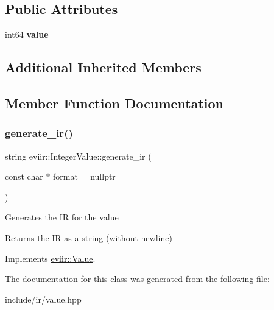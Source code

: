 \subsection*{Public Attributes}
\begin{DoxyCompactItemize}
\item 
\mbox{\label{classeviir_1_1IntegerValue_a6daae2d429977f76c8b1ab3b00a4ec33}} 
int64 {\bfseries value}
\end{DoxyCompactItemize}
\subsection*{Additional Inherited Members}


\subsection{Member Function Documentation}
\mbox{\label{classeviir_1_1IntegerValue_a7f2653e23a8165a0eb43109d152cc0a2}} 
\subsubsection{\texorpdfstring{generate\+\_\+ir()}{generate\_ir()}}
{\footnotesize\ttfamily string eviir\+::\+Integer\+Value\+::generate\+\_\+ir (\begin{DoxyParamCaption}\item[{const char $\ast$}]{format = {\ttfamily nullptr} }\end{DoxyParamCaption})\hspace{0.3cm}{\ttfamily [virtual]}}

Generates the IR for the value \begin{DoxyReturn}{Returns}
the IR as a string (without newline) 
\end{DoxyReturn}


Implements \hyperlink{classeviir_1_1Value_a0613bf660425df31e230681555f64dea}{eviir\+::\+Value}.



The documentation for this class was generated from the following file\+:\begin{DoxyCompactItemize}
\item 
include/ir/value.\+hpp\end{DoxyCompactItemize}

